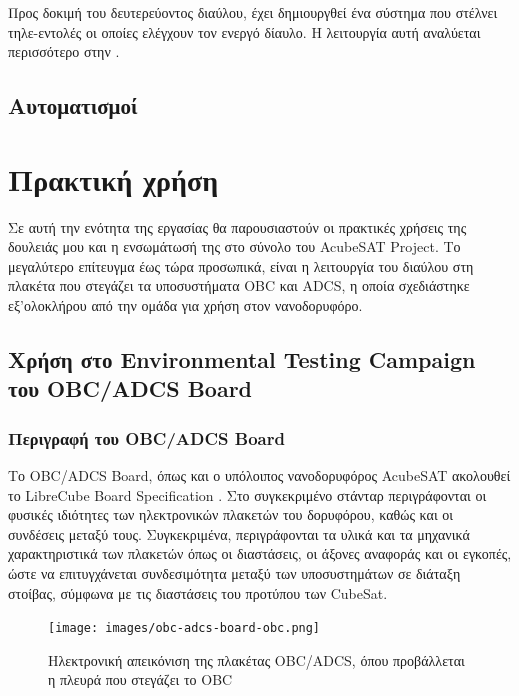 \documentclass[a4paper,nobib,justified]{tufte-book}
\begin{document}
Προς δοκιμή του δευτερεύοντος διαύλου, έχει δημιουργθεί ένα σύστημα που στέλνει τηλε-εντολές οι οποίες ελέγχουν τον ενεργό δίαυλο. Η λειτουργία αυτή αναλύεται περισσότερο στην .

\clearpage

\section{Αυτοματισμοί}

\clearpage

\chapter{Πρακτική χρήση}
\label{usage}
Σε αυτή την ενότητα της εργασίας θα παρουσιαστούν οι πρακτικές χρήσεις της δουλειάς μου και η ενσωμάτωσή της στο σύνολο του AcubeSAT Project. Το μεγαλύτερο επίτευγμα έως τώρα προσωπικά, είναι η λειτουργία του διαύλου στη πλακέτα που στεγάζει τα υποσυστήματα OBC και ADCS, η οποία σχεδιάστηκε εξ'ολοκλήρου από την ομάδα για χρήση στον νανοδορυφόρο.
\section{Χρήση στο Environmental Testing Campaign του OBC/ADCS Board}
\subsection{Περιγραφή του OBC/ADCS Board}
Το OBC/ADCS Board, όπως και ο υπόλοιπος νανοδορυφόρος AcubeSAT ακολουθεί το LibreCube Board Specification . Στο συγκεκριμένο στάνταρ περιγράφονται οι φυσικές ιδιότητες των ηλεκτρονικών πλακετών του δορυφόρου, καθώς και οι συνδέσεις μεταξύ τους. Συγκεκριμένα, περιγράφονται τα υλικά και τα μηχανικά χαρακτηριστικά των πλακετών όπως οι διαστάσεις, οι άξονες αναφοράς και οι εγκοπές, ώστε να επιτυγχάνεται συνδεσιμότητα μεταξύ των υποσυστημάτων σε διάταξη στοίβας, σύμφωνα με τις διαστάσεις του προτύπου των CubeSat.

\begin{figure}
	\centering
	\texttt{[image: images/obc-adcs-board-obc.png]}
	\caption[Ηλεκτρονική απεικόνιση της πλακέτας OBC/ADCS]{Ηλεκτρονική απεικόνιση της πλακέτας OBC/ADCS, όπου προβάλλεται η πλευρά που στεγάζει το OBC}
	\label{fig:obc-adcs-board-obc}
\end{figure}
\end{document}
